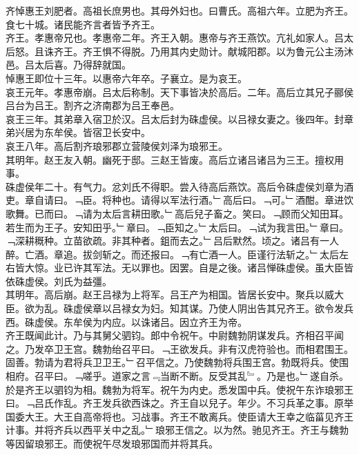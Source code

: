 \documentclass{zhvt-classic}
\begin{document}
\hspace*{2em}齐悼惠王刘肥者。高祖长庶男也。其母外妇也。曰曹氏。高祖六年。立肥为齐王。食七十城。诸民能齐言者皆予齐王。\\
\hspace*{2em}齐王。孝惠帝兄也。孝惠帝二年。齐王入朝。惠帝与齐王燕饮。亢礼如家人。吕太后怒。且诛齐王。齐王惧不得脱。乃用其内史勋计。献城阳郡。以为鲁元公主汤沐邑。吕太后喜。乃得辞就国。\\
\hspace*{2em}悼惠王即位十三年。以惠帝六年卒。子襄立。是为哀王。\\
\hspace*{2em}哀王元年。孝惠帝崩。吕太后称制。天下事皆决於高后。二年。高后立其兄子郦侯吕台为吕王。割齐之济南郡为吕王奉邑。\\
\hspace*{2em}哀王三年。其弟章入宿卫於汉。吕太后封为硃虚侯。以吕禄女妻之。後四年。封章弟兴居为东牟侯。皆宿卫长安中。\\
\hspace*{2em}哀王八年。高后割齐琅邪郡立营陵侯刘泽为琅邪王。\\
\hspace*{2em}其明年。赵王友入朝。幽死于邸。三赵王皆废。高后立诸吕诸吕为三王。擅权用事。\\
\hspace*{2em}硃虚侯年二十。有气力。忿刘氏不得职。尝入待高后燕饮。高后令硃虚侯刘章为酒吏。章自请曰。﹁臣。将种也。请得以军法行酒。﹂高后曰。﹁可。﹂酒酣。章进饮歌舞。已而曰。﹁请为太后言耕田歌。﹂高后兒子畜之。笑曰。﹁顾而父知田耳。若生而为王子。安知田乎。﹂章曰。﹁臣知之。﹂太后曰。﹁试为我言田。﹂章曰。﹁深耕穊种。立苗欲疏。非其种者。鉏而去之。﹂吕后默然。顷之。诸吕有一人醉。亡酒。章追。拔剑斩之。而还报曰。﹁有亡酒一人。臣谨行法斩之。﹂太后左右皆大惊。业已许其军法。无以罪也。因罢。自是之後。诸吕惮硃虚侯。虽大臣皆依硃虚侯。刘氏为益彊。\\
\hspace*{2em}其明年。高后崩。赵王吕禄为上将军。吕王产为相国。皆居长安中。聚兵以威大臣。欲为乱。硃虚侯章以吕禄女为妇。知其谋。乃使人阴出告其兄齐王。欲令发兵西。硃虚侯。东牟侯为内应。以诛诸吕。因立齐王为帝。\\
\hspace*{2em}齐王既闻此计。乃与其舅父驷钧。郎中令祝午。中尉魏勃阴谋发兵。齐相召平闻之。乃发卒卫王宫。魏勃绐召平曰。﹁王欲发兵。非有汉虎符验也。而相君围王。固善。勃请为君将兵卫卫王。﹂召平信之。乃使魏勃将兵围王宫。勃既将兵。使围相府。召平曰。﹁嗟乎。道家之言﹃当断不断。反受其乱﹄。乃是也。﹂遂自杀。於是齐王以驷钧为相。魏勃为将军。祝午为内史。悉发国中兵。使祝午东诈琅邪王曰。﹁吕氏作乱。齐王发兵欲西诛之。齐王自以兒子。年少。不习兵革之事。原举国委大王。大王自高帝将也。习战事。齐王不敢离兵。使臣请大王幸之临菑见齐王计事。并将齐兵以西平关中之乱。﹂琅邪王信之。以为然。驰见齐王。齐王与魏勃等因留琅邪王。而使祝午尽发琅邪国而并将其兵。\\
\end{document}
